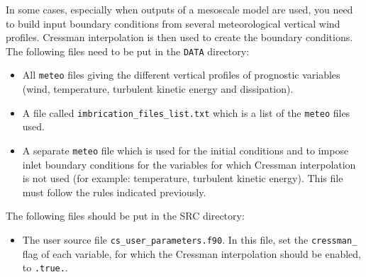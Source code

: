 {{

In some cases, especially when outputs of a mesoscale model are used, you
need to build input boundary conditions from several meteorological vertical
wind profiles. Cressman interpolation is then used to create the boundary
conditions. The following files need to be put in the \texttt{DATA} directory:
\begin{itemize}
\item All \texttt{meteo} files giving the different vertical profiles of
prognostic variables (wind, temperature, turbulent kinetic energy and
dissipation).
\item A file called \texttt{imbrication\_files\_list.txt} which is a list
of the \texttt{meteo} files used.
\item A separate \texttt{meteo} file which is used for the initial conditions
and to impose inlet boundary conditions for the variables for which Cressman
interpolation is not used (for example: temperature, turbulent kinetic energy).
This file must follow the rules indicated previously.
\end{itemize}
The following files should be put in the SRC directory:
\begin{itemize}
\item The user source file \texttt{cs\_user\_parameters.f90}. In this file, set
the \texttt{cressman\_} flag of each variable, for which the Cressman
interpolation should be enabled, to \texttt{.true.}.
\end{itemize}
%
}}
